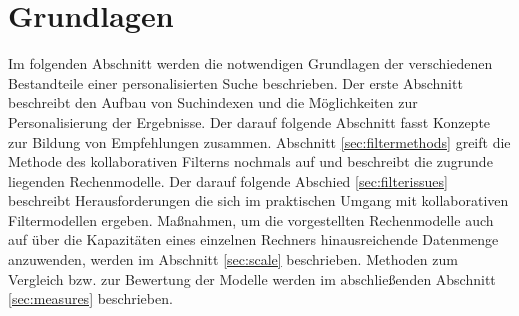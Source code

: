 \section{Grundlagen} %

Im folgenden Abschnitt werden die notwendigen Grundlagen der verschiedenen Bestandteile einer personalisierten Suche beschrieben. Der erste Abschnitt beschreibt den Aufbau von Suchindexen und die Möglichkeiten zur Personalisierung der Ergebnisse. Der darauf folgende Abschnitt fasst Konzepte zur Bildung von Empfehlungen zusammen. Abschnitt \ref{sec:filtermethods} greift die Methode des kollaborativen Filterns nochmals auf und beschreibt die zugrunde liegenden Rechenmodelle. Der darauf folgende Abschied \ref{sec:filterissues} beschreibt Herausforderungen die sich im praktischen Umgang mit kollaborativen Filtermodellen ergeben. Maßnahmen, um die vorgestellten Rechenmodelle auch auf über die Kapazitäten eines einzelnen Rechners hinausreichende Datenmenge anzuwenden, werden im Abschnitt \ref{sec:scale} beschrieben. Methoden zum Vergleich bzw. zur Bewertung der Modelle werden im abschließenden Abschnitt \ref{sec:measures}  beschrieben.






